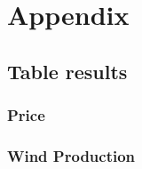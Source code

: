 \documentclass[twoside,11pt,openright]{report}
\begin{document}
\todo{\dots}



 



\chapter{Appendix}
\label{ch:appendix}
\section{Table results}
\subsection{Price}
\label{sec:priceResultAppendix}
 
\subsection{Wind Production}
\label{sec:windResultsAppendix}
 	
\end{document}
